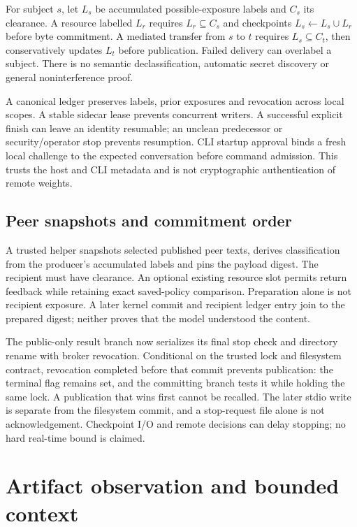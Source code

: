 \documentclass[conference]{IEEEtran}
\begin{document}
For subject \(s\), let \(L_s\) be accumulated possible-exposure labels and \(C_s\) its clearance. A resource labelled \(L_r\) requires \(L_r\subseteq C_s\) and checkpoints \(L_s\leftarrow L_s\cup L_r\) before byte commitment. A mediated transfer from \(s\) to \(t\) requires \(L_s\subseteq C_t\), then conservatively updates \(L_t\) before publication. Failed delivery can overlabel a subject. There is no semantic declassification, automatic secret discovery or general noninterference proof.

A canonical ledger preserves labels, prior exposures and revocation across local scopes. A stable sidecar lease prevents concurrent writers. A successful explicit finish can leave an identity resumable; an unclean predecessor or security/operator stop prevents resumption. CLI startup approval binds a fresh local challenge to the expected conversation before command admission. This trusts the host and CLI metadata and is not cryptographic authentication of remote weights.

\subsection{Peer snapshots and commitment order}\label{peer-snapshots-and-commitment-order}

A trusted helper snapshots selected published peer texts, derives classification from the producer's accumulated labels and pins the payload digest. The recipient must have clearance. An optional existing resource slot permits return feedback while retaining exact saved-policy comparison. Preparation alone is not recipient exposure. A later kernel commit and recipient ledger entry join to the prepared digest; neither proves that the model understood the content.

The public-only result branch now serializes its final stop check and directory rename with broker revocation. Conditional on the trusted lock and filesystem contract, revocation completed before that commit prevents publication: the terminal flag remains set, and the committing branch tests it while holding the same lock. A publication that wins first cannot be recalled. The later stdio write is separate from the filesystem commit, and a stop-request file alone is not acknowledgement. Checkpoint I/O and remote decisions can delay stopping; no hard real-time bound is claimed.

\section{Artifact observation and bounded context}\label{artifact-observation-and-bounded-context}
\end{document}
